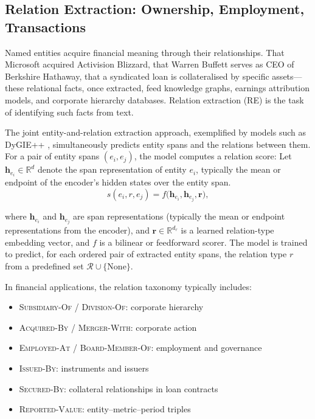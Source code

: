 \subsection{Relation Extraction: Ownership, Employment, Transactions}
\label{sec:ch14-relation-extraction}

Named entities acquire financial meaning through their relationships. That Microsoft
acquired Activision Blizzard, that Warren Buffett serves as CEO of Berkshire Hathaway,
that a syndicated loan is collateralised by specific assets---these relational facts,
once extracted, feed knowledge graphs, earnings attribution models, and corporate
hierarchy databases. Relation extraction (RE) is the task of identifying such facts from
text.

The joint entity-and-relation extraction approach, exemplified by models such as
DyGIE++ \citep{wadden2019dygiepp}, simultaneously predicts entity spans and the
relations between them. For a pair of entity spans $(e_i, e_j)$, the model computes a
relation score:
Let $\mathbf{h}_{e_i} \in \mathbb{R}^d$ denote the span representation of entity $e_i$, typically the mean or endpoint of the encoder's hidden states over the entity span.
\begin{equation}
\label{eq:relation-score}
s(e_i, r, e_j) = f\bigl(\mathbf{h}_{e_i}, \mathbf{h}_{e_j}, \mathbf{r}\bigr),
\end{equation}

where $\mathbf{h}_{e_i}$ and $\mathbf{h}_{e_j}$ are span representations (typically
the mean or endpoint representations from the encoder), and $\mathbf{r} \in \mathbb{R}^{d_r}$ is a learned relation-type embedding vector, and $f$ is a bilinear or feedforward scorer. The model is trained to
predict, for each ordered pair of extracted entity spans, the relation type $r$ from a
predefined set $\mathcal{R} \cup \{\text{None}\}$.

In financial applications, the relation taxonomy typically includes:
\begin{itemize}
  \item \textsc{Subsidiary-Of} / \textsc{Division-Of}: corporate hierarchy
  \item \textsc{Acquired-By} / \textsc{Merger-With}: corporate action
  \item \textsc{Employed-At} / \textsc{Board-Member-Of}: employment and governance
  \item \textsc{Issued-By}: instruments and issuers
  \item \textsc{Secured-By}: collateral relationships in loan contracts
  \item \textsc{Reported-Value}: entity--metric--period triples
\end{itemize}

